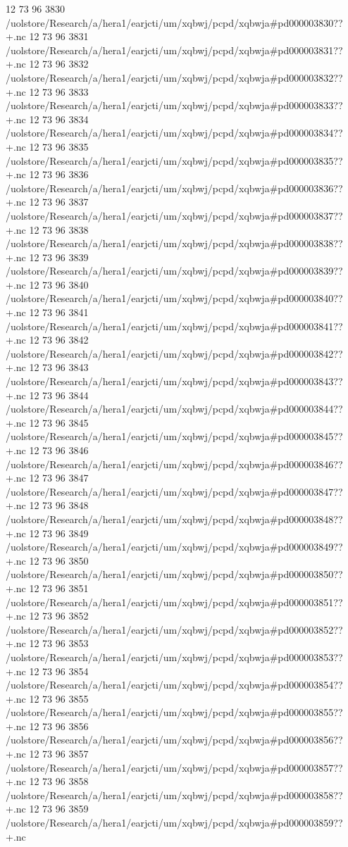 12 73 96
3830
/uolstore/Research/a/hera1/earjcti/um/xqbwj/pcpd/xqbwja#pd000003830??+.nc
12 73 96
3831
/uolstore/Research/a/hera1/earjcti/um/xqbwj/pcpd/xqbwja#pd000003831??+.nc
12 73 96
3832
/uolstore/Research/a/hera1/earjcti/um/xqbwj/pcpd/xqbwja#pd000003832??+.nc
12 73 96
3833
/uolstore/Research/a/hera1/earjcti/um/xqbwj/pcpd/xqbwja#pd000003833??+.nc
12 73 96
3834
/uolstore/Research/a/hera1/earjcti/um/xqbwj/pcpd/xqbwja#pd000003834??+.nc
12 73 96
3835
/uolstore/Research/a/hera1/earjcti/um/xqbwj/pcpd/xqbwja#pd000003835??+.nc
12 73 96
3836
/uolstore/Research/a/hera1/earjcti/um/xqbwj/pcpd/xqbwja#pd000003836??+.nc
12 73 96
3837
/uolstore/Research/a/hera1/earjcti/um/xqbwj/pcpd/xqbwja#pd000003837??+.nc
12 73 96
3838
/uolstore/Research/a/hera1/earjcti/um/xqbwj/pcpd/xqbwja#pd000003838??+.nc
12 73 96
3839
/uolstore/Research/a/hera1/earjcti/um/xqbwj/pcpd/xqbwja#pd000003839??+.nc
12 73 96
3840
/uolstore/Research/a/hera1/earjcti/um/xqbwj/pcpd/xqbwja#pd000003840??+.nc
12 73 96
3841
/uolstore/Research/a/hera1/earjcti/um/xqbwj/pcpd/xqbwja#pd000003841??+.nc
12 73 96
3842
/uolstore/Research/a/hera1/earjcti/um/xqbwj/pcpd/xqbwja#pd000003842??+.nc
12 73 96
3843
/uolstore/Research/a/hera1/earjcti/um/xqbwj/pcpd/xqbwja#pd000003843??+.nc
12 73 96
3844
/uolstore/Research/a/hera1/earjcti/um/xqbwj/pcpd/xqbwja#pd000003844??+.nc
12 73 96
3845
/uolstore/Research/a/hera1/earjcti/um/xqbwj/pcpd/xqbwja#pd000003845??+.nc
12 73 96
3846
/uolstore/Research/a/hera1/earjcti/um/xqbwj/pcpd/xqbwja#pd000003846??+.nc
12 73 96
3847
/uolstore/Research/a/hera1/earjcti/um/xqbwj/pcpd/xqbwja#pd000003847??+.nc
12 73 96
3848
/uolstore/Research/a/hera1/earjcti/um/xqbwj/pcpd/xqbwja#pd000003848??+.nc
12 73 96
3849
/uolstore/Research/a/hera1/earjcti/um/xqbwj/pcpd/xqbwja#pd000003849??+.nc
12 73 96
3850
/uolstore/Research/a/hera1/earjcti/um/xqbwj/pcpd/xqbwja#pd000003850??+.nc
12 73 96
3851
/uolstore/Research/a/hera1/earjcti/um/xqbwj/pcpd/xqbwja#pd000003851??+.nc
12 73 96
3852
/uolstore/Research/a/hera1/earjcti/um/xqbwj/pcpd/xqbwja#pd000003852??+.nc
12 73 96
3853
/uolstore/Research/a/hera1/earjcti/um/xqbwj/pcpd/xqbwja#pd000003853??+.nc
12 73 96
3854
/uolstore/Research/a/hera1/earjcti/um/xqbwj/pcpd/xqbwja#pd000003854??+.nc
12 73 96
3855
/uolstore/Research/a/hera1/earjcti/um/xqbwj/pcpd/xqbwja#pd000003855??+.nc
12 73 96
3856
/uolstore/Research/a/hera1/earjcti/um/xqbwj/pcpd/xqbwja#pd000003856??+.nc
12 73 96
3857
/uolstore/Research/a/hera1/earjcti/um/xqbwj/pcpd/xqbwja#pd000003857??+.nc
12 73 96
3858
/uolstore/Research/a/hera1/earjcti/um/xqbwj/pcpd/xqbwja#pd000003858??+.nc
12 73 96
3859
/uolstore/Research/a/hera1/earjcti/um/xqbwj/pcpd/xqbwja#pd000003859??+.nc
